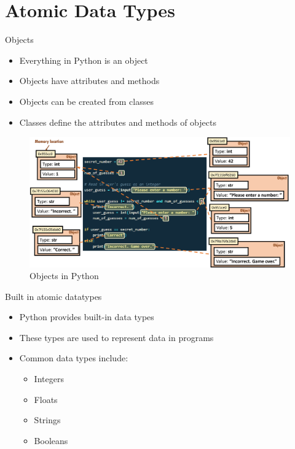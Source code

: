 \section{Atomic Data Types}
\begin{frame}{Objects}
    \begin{itemize}
        \item Everything in Python is an object
        \item Objects have attributes and methods
        \item Objects can be created from classes
        \item Classes define the attributes and methods of objects
    \end{itemize}
\end{frame}
\begin{frame}
    \begin{figure}
        \centering
        \includegraphics[width=1.0\textwidth]{pics/objects.png}
        \caption{Objects in Python}
    \end{figure}
\end{frame}
\begin{frame}{Built in atomic datatypes}
    \begin{itemize}
        \item Python provides built-in data types
        \item These types are used to represent data in programs
        \item Common data types include:
        \begin{itemize}
            \item Integers
            \item Floats
            \item Strings
            \item Booleans
        \end{itemize}
    \end{itemize}
\end{frame}
